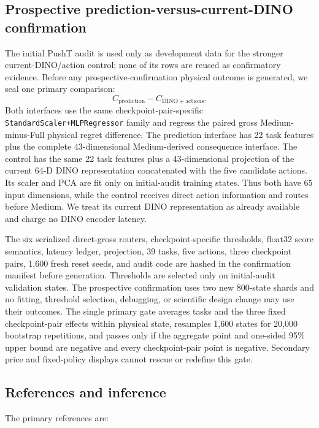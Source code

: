 \documentclass[10pt]{article}
\theoremstyle{definition}
\theoremstyle{remark}
\begin{document}
\subsection{Prospective prediction-versus-current-DINO confirmation}
\label{sec:prospective_method}

The initial PushT audit is used only as development data for the stronger
current-DINO/action control; none of its rows are reused as confirmatory
evidence.  Before any prospective-confirmation physical outcome is generated, we seal one primary comparison:
\[
  C_{\mathrm{prediction}}-C_{\mathrm{DINO+actions}}.
\]
Both interfaces use the same checkpoint-pair-specific
\texttt{StandardScaler+MLPRegressor} family and regress the paired gross
Medium-minus-Full physical regret difference.  The prediction interface has 22
task features plus the complete 43-dimensional Medium-derived consequence
interface.  The control has the same 22 task features plus a 43-dimensional
projection of the current 64-D DINO representation concatenated with the five
candidate actions.  Its scaler and PCA are fit only on initial-audit training states.
Thus both have 65 input dimensions, while the control receives direct action
information and routes before Medium.  We treat its current DINO representation
as already available and charge no DINO encoder latency.

The six serialized direct-gross routers, checkpoint-specific thresholds,
float32 score semantics, latency ledger, projection, 39 tasks, five actions,
three checkpoint pairs, 1,600 fresh reset seeds, and audit code are hashed in
the confirmation manifest before generation.  Thresholds are selected only on
initial-audit validation states.  The prospective confirmation uses two new
800-state shards and no fitting,
threshold selection, debugging, or scientific design change may use their
outcomes.  The single primary gate averages tasks and the three fixed
checkpoint-pair effects within physical state, resamples 1,600 states for
20,000 bootstrap repetitions, and passes only if the aggregate point and
one-sided 95\% upper bound are negative and every checkpoint-pair point is
negative.  Secondary price and fixed-policy displays cannot rescue or redefine
this gate.

\subsection{References and inference}

The primary references are:
\end{document}
